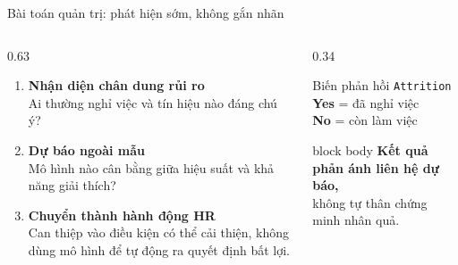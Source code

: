 \documentclass[10pt,aspectratio=169]{beamer}
\begin{document}
\begin{frame}{Bài toán quản trị: phát hiện sớm, không gắn nhãn}
  \begin{columns}[T,onlytextwidth]
    \begin{column}{0.63\textwidth}
      \vspace{0.12cm}
      \begin{enumerate}
        \item \textbf{Nhận diện chân dung rủi ro}\\
              Ai thường nghỉ việc và tín hiệu nào đáng chú ý?
        \vspace{0.22cm}
        \item \textbf{Dự báo ngoài mẫu}\\
              Mô hình nào cân bằng giữa hiệu suất và khả năng giải thích?
        \vspace{0.22cm}
        \item \textbf{Chuyển thành hành động HR}\\
              Can thiệp vào điều kiện có thể cải thiện, không dùng mô hình
              để tự động ra quyết định bất lợi.
      \end{enumerate}
    \end{column}
    \begin{column}{0.34\textwidth}
      \begin{block}{Biến phản hồi}
        \centering
        \texttt{Attrition}\\[0.08cm]
        \textbf{Yes} = đã nghỉ việc\\
        \textbf{No} = còn làm việc
      \end{block}
      \vspace{0.12cm}
      \begin{beamercolorbox}[sep=0.16cm,rounded=true]{block body}
        \centering\small
        \textbf{Kết quả phản ánh liên hệ dự báo,}\\
        không tự thân chứng minh nhân quả.
      \end{beamercolorbox}
    \end{column}
  \end{columns}
\end{frame}
\end{document}
